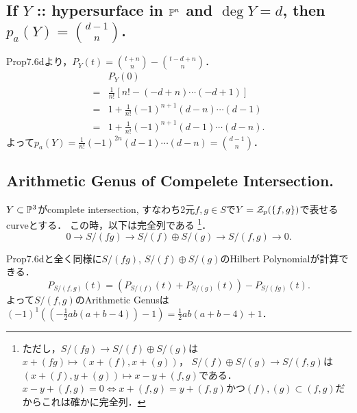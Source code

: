 \documentclass[a4paper]{jsarticle}
\begin{document}
    \subsection{If $Y$ :: hypersurface in $\mathbb{P}^n$ and $\deg Y=d$, then $p_a(Y)=\binom{d-1}{n}$.}
    Prop7.6dより，$P_Y(t)=\binom{t+n}{n}-\binom{t-d+n}{n}$．
    \begin{align*}
        {}&P_Y(0) \\
        = &\frac{1}{n!} \left[ n!-(-d+n)\cdots(-d+1) \right] \\
        = &1+\frac{1}{n!}(-1)^{n+1}(d-n)\cdots(d-1) \\
        = &1+\frac{1}{n!}(-1)^{n+1}(d-1)\cdots(d-n).
    \end{align*}
    よって$p_a(Y)=\frac{1}{n!}(-1)^{2n}(d-1)\cdots(d-n)=\binom{d-1}{n}$．

    \subsection{Arithmetic Genus of Compelete Intersection.}
    $Y \subset \mathbb{P}^3$がcomplete intersection, すなわち2元$f,g \in S$で$Y=\mathcal{Z}_p(\{f,g\})$で表せるcurveとする．
    この時，以下は完全列である
    \footnote
    {
    ただし，$S/(fg) \to S/(f) \oplus S/(g)$は$x+(fg) \mapsto (x+(f), x+(g))$，
    $S/(f) \oplus S/(g) \to S/(f,g)$は$(x+(f), y+(g)) \mapsto x-y+(f,g)$である．
    $x-y+(f,g)=0 \iff x+(f,g)=y+(f,g)$かつ$(f),(g) \subset (f,g)$だからこれは確かに完全列．
    }．
    \[ 0 \to S/(fg) \to S/(f) \oplus S/(g) \to S/(f,g) \to 0. \]

    Prop7.6dと全く同様に$S/(fg)$, $S/(f) \oplus S/(g)$のHilbert Polynomialが計算できる．
    \[ P_{S/(f,g)}(t)=(P_{S/(f)}(t)+P_{S/(g)}(t))-P_{S/(fg)}(t). \]
    よって$S/(f,g)$のArithmetic Genusは
    $(-1)^1((-\frac{1}{2}ab(a+b-4))-1)=\frac{1}{2}ab(a+b-4)+1$．
\end{document}
